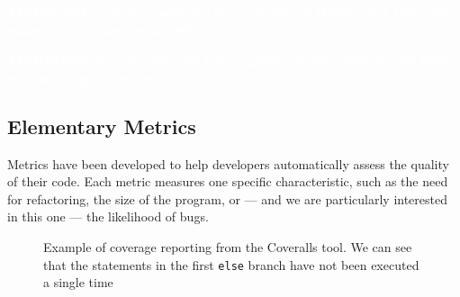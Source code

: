 \documentclass[11pt]{sdm_internship}
\newcommand{\todo}[1]{\colorbox{Red!75}{\textcolor{white}{\textbf{TODO\ifx&#1&\else: #1\fi}}}}
\theoremstyle{definition}
\begin{document}
\todo{unit tests also make up for examples in OSS}

\todo{how do you know you have a good oracle}

\subsection{Elementary Metrics}%
\label{ssec:elementary_metrics}
Metrics have been developed to help developers automatically assess the quality of their code.
Each metric measures one specific characteristic, such as the need for refactoring, the size of the program, or --- and we are particularly interested in this one --- the likelihood of bugs.

\begin{figure}
  \centering
  \cprotect\caption{Example of coverage reporting from the Coveralls\protect\footnotemark{} tool. We can see that the statements in the first \texttt{else} branch have not been executed a single time}%
  \label{fig:screenshot_coverage}
\end{figure}
\end{document}
